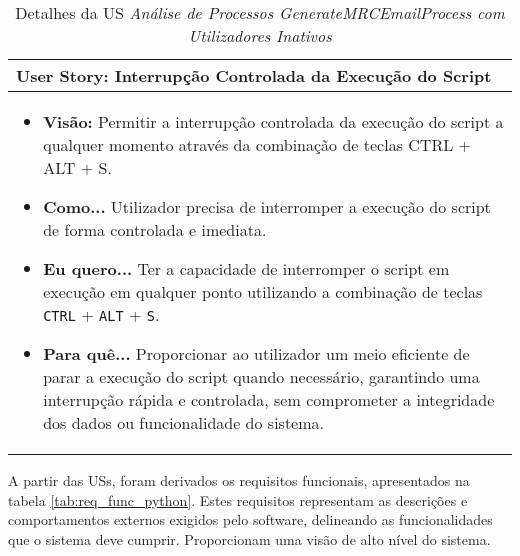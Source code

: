                \begin{table}[htbp] %
                    \centering
                    \begin{tabularx}{1\textwidth}{|>{\raggedright\arraybackslash}X|}
                        \hline
                        \rowcolor{lightgray}
                        \textbf{User Story:} Interrupção Controlada da Execução do Script \\
                        \hline
                        \rowcolor{lightgray!20}
                                        
                        \begin{itemize}
                            \item \textbf{Visão:} Permitir a interrupção controlada da execução do script a qualquer momento através da combinação de teclas CTRL + ALT + S.

                            \item \textbf{Como...} Utilizador precisa de interromper a execução do script de forma controlada e imediata.

                            \item \textbf{Eu quero...} Ter a capacidade de interromper o script em execução em qualquer ponto utilizando a combinação de teclas \texttt{CTRL} + \texttt{ALT} + \texttt{S}.

                            \item \textbf{Para quê...} Proporcionar ao utilizador um meio eficiente de parar a execução do script quando necessário, garantindo uma interrupção rápida e controlada, sem comprometer a integridade dos dados ou funcionalidade do sistema.
                        \end{itemize}
                        \\
                        \hline
                    \end{tabularx}
                    \caption{Detalhes da US \textit{Análise de Processos GenerateMRCEmailProcess com Utilizadores Inativos}}\label{table:python_us4}
                \end{table}

            \label{secsecsec:req_func_python}

                A partir das USs, foram derivados os requisitos funcionais, apresentados na tabela \ref{tab:req_func_python}. Estes requisitos representam as descrições e comportamentos externos exigidos pelo software, delineando as funcionalidades que o sistema deve cumprir. Proporcionam uma visão de alto nível do sistema.
                
